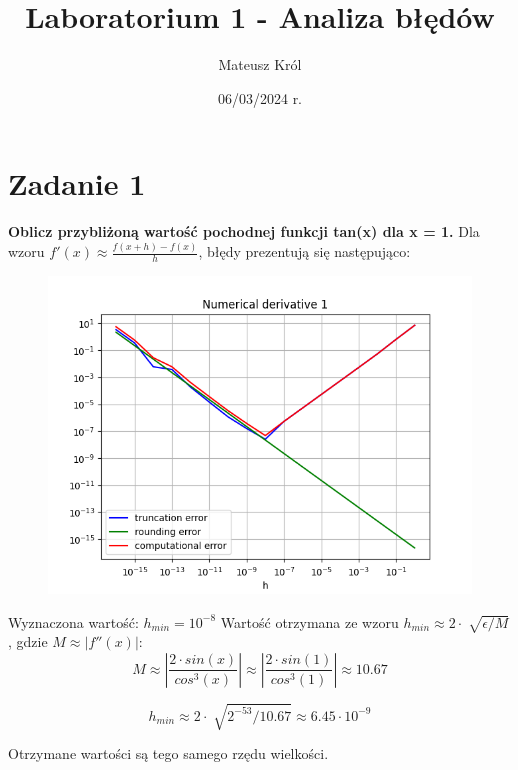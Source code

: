 \documentclass{article}
\title{Laboratorium 1 - Analiza błędów}
\author{Mateusz Król}
\date{06/03/2024 r.}
\begin{document}
\maketitle


\section*{Zadanie 1}
\textbf{Oblicz przybliżoną wartość pochodnej funkcji tan(x) dla x = 1.} 
\newline\newline
Dla wzoru $f'(x)\approx\frac{f(x+h)-f(x)}{h}$, błędy prezentują się następująco:
\begin{figure}[h!]
\includegraphics[width=\linewidth]{figures/numerical_derivative_1.png}
\end{figure}
\newline
Wyznaczona wartość: $h_{min} = 10^{-8}$ \newline
Wartość otrzymana ze wzoru $h_{min} \approx 2\cdot\sqrt[]{\epsilon/M}$,
gdzie $M \approx \left|f''(x)\right|$: \newline
$$M\approx \left|\frac{2 \cdot sin(x)}{cos^{3}(x)}\right|
\approx \left|\frac{2 \cdot sin(1)}{cos^{3}(1)}\right|
\approx 10.67$$

$$h_{min} \approx 2\cdot\sqrt[]{2^{-53}/10.67}
\approx 6.45 \cdot 10^{-9}$$

Otrzymane wartości są tego samego rzędu wielkości.  \newline
\end{document}
